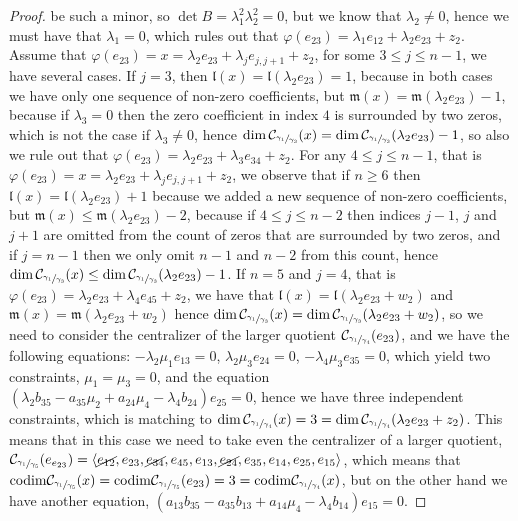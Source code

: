 \documentclass[12pt,fleqn]{article}
\newcommand*\circled[1]{\tikz[baseline=(char.base)]{
            \small \node[shape=circle,draw,inner sep=1pt] (char) {#1};}}
\begin{document}
\begin{proof}
be such a minor, so $\det B=\lambda_1^2\lambda_2^2=0$, but we know that $\lambda_2\neq 0$, hence we must have that $\lambda_1=0$, which rules out that $\varphi(e_{23})=\lambda_1 e_{12}+\lambda_2 e_{23}+z_2$. Assume that $\varphi(e_{23})=x=\lambda_2 e_{23}+\lambda_j e_{j,j+1}+z_2$, for some $3\leq j\leq n-1$, we have several cases. If $j=3$, then $\mathfrak{l}(x)=\mathfrak{l}(\lambda_2 e_{23})=1$, because in both cases we have only one sequence of non-zero coefficients, but $\mathfrak{m}(x)=\mathfrak{m}(\lambda_2 e_{23})-1$, because if $\lambda_3=0$ then the zero coefficient in index $4$ is surrounded by two zeros, which is not the case if $\lambda_3\neq 0$, hence $\dim\mathcal{C}_{\sfrac{\gamma_1}{\gamma_3}}(x)=\dim\mathcal{C}_{\sfrac{\gamma_1}{\gamma_3}}(\lambda_2 e_{23})-1$, so also we rule out that $\varphi(e_{23})=\lambda_2 e_{23}+\lambda_3 e_{34}+z_2$. For any $4\leq j\leq n-1$, that is $\varphi(e_{23})=x=\lambda_2 e_{23}+\lambda_j e_{j,j+1}+z_2$, we observe that if $n\geq 6$ then $\mathfrak{l}(x)=\mathfrak{l}(\lambda_2 e_{23})+1$ because we added a new sequence of non-zero coefficients, but $\mathfrak{m}(x)\leq\mathfrak{m}(\lambda_2 e_{23})-2$, because if $4\leq j\leq n-2$ then indices $j-1$, $j$ and $j+1$ are omitted from the count of zeros that are surrounded by two zeros, and if $j=n-1$ then we only omit $n-1$ and $n-2$ from this count, hence $\dim\mathcal{C}_{\sfrac{\gamma_1}{\gamma_3}}(x)\leq\dim\mathcal{C}_{\sfrac{\gamma_1}{\gamma_3}}(\lambda_2 e_{23})-1$. If $n=5$ and $j=4$, that is $\varphi(e_{23})=\lambda_2 e_{23}+\lambda_4 e_{45}+z_2$, we have that $\mathfrak{l}(x)=\mathfrak{l}(\lambda_2 e_{23}+w_2)$ and $\mathfrak{m}(x)=\mathfrak{m}(\lambda_2 e_{23}+w_2)$ hence $\dim\mathcal{C}_{\sfrac{\gamma_1}{\gamma_3}}(x)=\dim\mathcal{C}_{\sfrac{\gamma_1}{\gamma_3}}(\lambda_2 e_{23}+w_2)$, so we need to consider the centralizer of the larger quotient $\mathcal{C}_{\sfrac{\gamma_1}{\gamma_4}}(e_{23})$, and we have the following equations: \circled{1} $-\lambda_2\mu_1 e_{13}=0$, \circled{2} $\lambda_2\mu_3 e_{24}=0$, \circled{3} $-\lambda_4\mu_3 e_{35}=0$, which yield two constraints, $\mu_1=\mu_3=0$, and the equation \circled{4} $(\lambda_2 b_{35}-a_{35}\mu_2+a_{24}\mu_4-\lambda_4 b_{24})e_{25}=0$, hence we have three independent constraints, which is matching to $\dim\mathcal{C}_{\sfrac{\gamma_1}{\gamma_4}}(x)=3=\dim\mathcal{C}_{\sfrac{\gamma_1}{\gamma_4}}(\lambda_2 e_{23}+z_2)$. This means that in this case we need to take even the centralizer of a larger quotient, $\mathcal{C}_{\sfrac{\gamma_1}{\gamma_5}}(e_{e_{23}})=\langle \cancel{e_{12}},e_{23},\cancel{e_{34}},e_{45},e_{13},\cancel{e_{24}},e_{35},e_{14},e_{25},e_{15}\rangle$, which means that $\mathrm{codim}\mathcal{C}_{\sfrac{\gamma_1}{\gamma_5}}(x)=\mathrm{codim}\mathcal{C}_{\sfrac{\gamma_1}{\gamma_5}}(e_{23})=3=\mathrm{codim}\mathcal{C}_{\sfrac{\gamma_1}{\gamma_4}}(x)$, but on the other hand we have another equation, \circled{5} $(a_{13}b_{35}-a_{35}b_{13}+a_{14}\mu_4-\lambda_4 b_{14})e_{15}=0$.

\end{proof}
\end{document}

